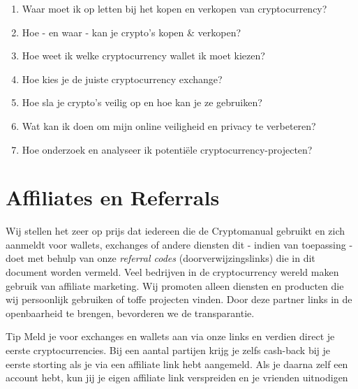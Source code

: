     \medskip 
    \begin{enumerate}[label=(\alph*)]
      \setlength\itemsep{0em}
        \item {Waar moet ik op letten bij het kopen en verkopen van cryptocurrency?} 
        \item {Hoe - en waar - kan je crypto's kopen \& verkopen?}
        \item {Hoe weet ik welke cryptocurrency wallet ik moet kiezen?}
        \item {Hoe kies je de juiste cryptocurrency exchange?}
        \item {Hoe sla je crypto's veilig op en hoe kan je ze gebruiken?}
        \item {Wat kan ik doen om mijn online veiligheid en privacy te verbeteren?}
        \item {Hoe onderzoek en analyseer ik potenti{\"e}le cryptocurrency-projecten?} 
     \end{enumerate}


\section*{Affiliates en Referrals}
Wij stellen het zeer op prijs dat iedereen die de {\selectfont Cryptomanual} gebruikt en zich aanmeldt voor wallets, exchanges of andere diensten dit - indien van toepassing - doet met behulp van onze \emph{referral codes} (doorverwijzingslinks) die in dit document worden vermeld. Veel bedrijven in de cryptocurrency wereld maken gebruik van affiliate marketing. Wij promoten alleen diensten en producten die wij persoonlijk gebruiken of toffe projecten vinden. Door deze partner links in de openbaarheid te brengen, bevorderen we de transparantie.\medskip

\begin{tipbox}{Tip}
Meld je voor exchanges en wallets aan via onze links en verdien direct je eerste cryptocurrencies. Bij een aantal partijen krijg je zelfs cash-back bij je eerste storting als je via een affiliate link hebt aangemeld. Als je daarna zelf een account hebt, kun jij je eigen affiliate link verspreiden en je vrienden uitnodigen
\end{tipbox}

\medskip

